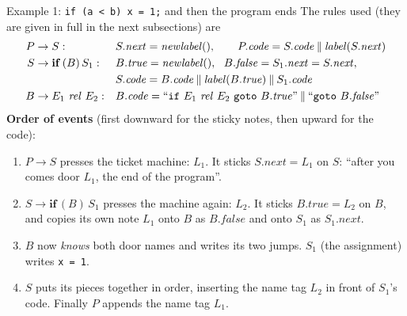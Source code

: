 \documentclass[11pt,a4paper]{article}
\newcommand{\cc}{\mathbin{\|}}
\newcommand{\at}[2]{\ensuremath{#1.\mathit{#2}}}
\begin{document}
\begin{examplebox}{Example 1: \texttt{if (a < b) x = 1;} and then the program ends}
The rules used (they are given in full in the next subsections) are
\begin{align*}
P &\to S: && \at{S}{next}=\mathit{newlabel}(),\qquad \at{P}{code}=\at{S}{code}\cc\mathit{label}(\at{S}{next})\\
S &\to \mathbf{if}\,(B)\,S_1: && \at{B}{true}=\mathit{newlabel}(),\ \ \at{B}{false}=\at{S_1}{next}=\at{S}{next},\\
  & && \at{S}{code}=\at{B}{code}\cc\mathit{label}(\at{B}{true})\cc\at{S_1}{code}\\
B &\to E_1\ \mathit{rel}\ E_2: && \at{B}{code}=\text{``\texttt{if} $E_1$ \textit{rel} $E_2$ \texttt{goto} \at{B}{true}''}\cc\text{``\texttt{goto} \at{B}{false}''}
\end{align*}
\textbf{Order of events} (first downward for the sticky notes, then upward for the code):
\begin{enumerate}[nosep]
\item $P\to S$ presses the ticket machine: $L_1$. It sticks \at{S}{next}$=L_1$ on $S$: ``after you comes door $L_1$, the end of the program''.
\item $S\to\mathbf{if}\,(B)\,S_1$ presses the machine again: $L_2$. It sticks \at{B}{true}$=L_2$ on $B$, and copies its own note $L_1$ onto $B$ as \at{B}{false} and onto $S_1$ as \at{S_1}{next}.
\item $B$ now \emph{knows} both door names and writes its two jumps. $S_1$ (the assignment) writes \texttt{x = 1}.
\item $S$ puts its pieces together in order, inserting the name tag $L_2$ in front of $S_1$'s code. Finally $P$ appends the name tag $L_1$.
\end{enumerate}


\end{examplebox}
\end{document}
